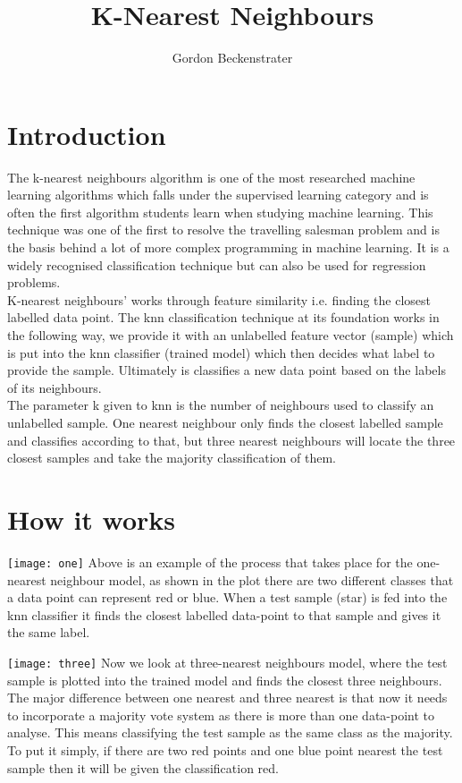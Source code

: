\documentclass[12pt, a4paper]{article}
\title{K-Nearest Neighbours}
\author{Gordon Beckenstrater}
\date{}
\begin{document}
\maketitle


\section*{Introduction}

The k-nearest neighbours algorithm is one of the most researched machine learning algorithms which falls under the supervised learning category and is often the first algorithm students learn when studying machine learning. This technique was one of the first to resolve the travelling salesman problem and is the basis behind a lot of more complex programming in machine learning. It is a widely recognised classification technique but can also be used for regression problems. 
\newline\\
K-nearest neighbours’ works through feature similarity i.e. finding the closest labelled data point. The knn classification technique at its foundation works in the following way, we provide it with an unlabelled feature vector (sample) which is put into the knn classifier (trained model) which then decides what label to provide the sample. Ultimately is classifies a new data point based on the labels of its neighbours.
\newline\\
The parameter k given to knn is the number of neighbours used to classify an unlabelled sample. One nearest neighbour only finds the closest labelled sample and classifies according to that, but three nearest neighbours will locate the three closest samples and take the majority classification of them. 

\section*{How it works}

\texttt{[image: one]}
\newline
Above is an example of the process that takes place for the one-nearest neighbour model, as shown in the plot there are two different classes that a data point can represent red or blue. When a test sample (star) is fed into the knn classifier it finds the closest labelled data-point to that sample and gives it the same label.

\texttt{[image: three]}
\newline
Now we look at three-nearest neighbours model, where the test sample is plotted into the trained model and finds the closest three neighbours. The major difference between one nearest and three nearest is that now it needs to incorporate a majority vote system as there is more than one data-point to analyse. This means classifying the test sample as the same class as the majority. To put it simply, if there are two red points and one blue point nearest the test sample then it will be given the classification red.
\end{document}
